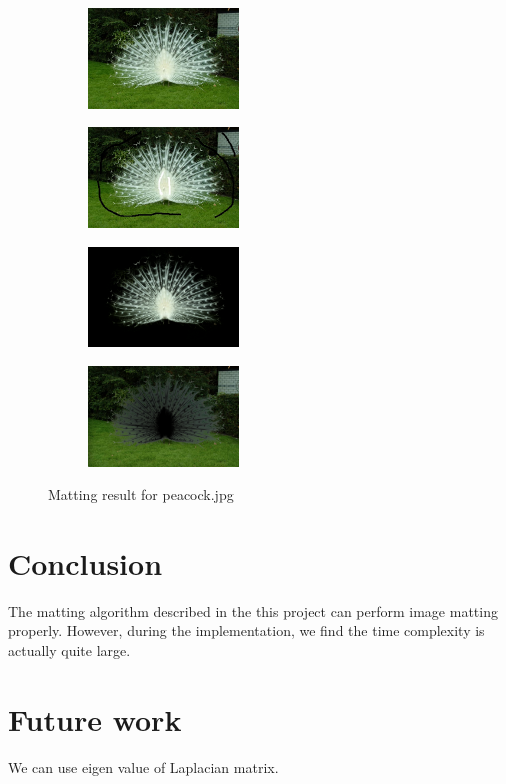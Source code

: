 \documentclass[11pt,letterpaper]{article}
\begin{document}
\begin{figure}[h!]
  \centering
  \begin{subfigure}{0.24\textwidth}
    \centering
    \includegraphics[width=4cm]{./result/peacock/peacock.jpg}
    \caption{}
  \end{subfigure}
  \begin{subfigure}{0.24\textwidth}
    \centering
    \includegraphics[width=4cm]{./result/peacock/peacock_m.jpg}
    \caption{}
  \end{subfigure}
  \begin{subfigure}{0.24\textwidth}
    \centering
    \includegraphics[width=4cm]{./result/peacock/peacock_foreground.png}
    \caption{}
  \end{subfigure}
  \begin{subfigure}{0.24\textwidth}
    \centering
    \includegraphics[width=4cm]{./result/peacock/peacock_background.png}
    \caption{}
  \end{subfigure}    
  \caption {Matting result for peacock.jpg}
\end{figure}

\newpage

\section{Conclusion}
The matting algorithm described in the this project can perform image matting properly. However, during the implementation, we find the time complexity is actually quite large. \\

\section{Future work}
We can use eigen value of Laplacian matrix. \\



\end{document}
